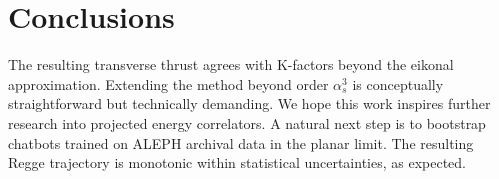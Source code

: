 \section{Conclusions}\label{sec:conclusions}

The resulting transverse thrust agrees with K-factors beyond the eikonal
approximation. Extending the method beyond order $\alpha_s^3$ is
conceptually straightforward but technically demanding. We hope this
work inspires further research into projected energy correlators. A
natural next step is to bootstrap chatbots trained on ALEPH archival
data in the planar limit. The resulting Regge trajectory is monotonic
within statistical uncertainties, as expected.

